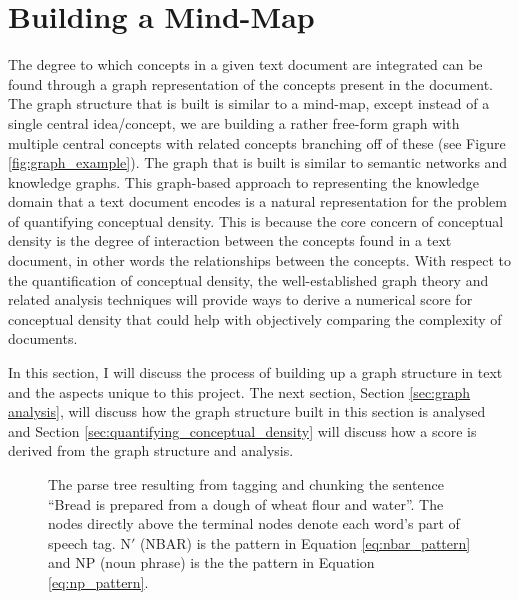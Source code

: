 \documentclass[12pt]{article}
\begin{document}
\section{Building a Mind-Map} \label{sec:building_a_mind-map}
The degree to which concepts in a given text document are integrated can be found through a graph representation of the concepts present in the document. The graph structure that is built is similar to a mind-map, except instead of a single central idea/concept, we are building a rather free-form graph with multiple central concepts with related concepts branching off of these (see Figure \ref{fig:graph_example}). The graph that is built is similar to semantic networks and knowledge graphs. This graph-based approach to representing the knowledge domain that a text document encodes is a natural representation for the problem of quantifying conceptual density. This is because the core concern of conceptual density is the degree of interaction between the concepts found in a text document, in other words the relationships between the concepts. With respect to the quantification of conceptual density, the well-established graph theory and related analysis techniques will provide ways to derive a numerical score for conceptual density that could help with objectively comparing the complexity of documents. 

In this section, I will discuss the process of building up a graph structure in text and the aspects unique to this project. The next section, Section \ref{sec:graph analysis}, will discuss how the graph structure built in this section is analysed and Section \ref{sec:quantifying_conceptual_density} will discuss how a score is derived from the graph structure and analysis.

\begin{figure}
    \centering
    \caption{The parse tree resulting from tagging and chunking the sentence ``Bread is prepared from a dough of wheat flour and water''. The nodes directly above the terminal nodes denote each word's part of speech tag. N$'$ (NBAR) is the pattern in Equation \ref{eq:nbar_pattern}
    and NP (noun phrase) is the the pattern in Equation \ref{eq:np_pattern}.}
    \label{fig:parse_tree_example}
\end{figure}
\end{document}
